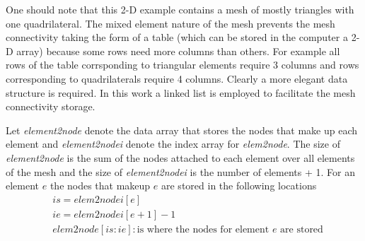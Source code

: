 One should note that this 2-D example contains a mesh of mostly triangles with one quadrilateral.  The mixed element nature of the mesh prevents the mesh connectivity taking the form of a table (which can be stored in the computer a 2-D array) because some rows need more columns than others.  For example all rows of the table corrsponding to triangular elements require 3 columns and rows corresponding to quadrilaterals require 4 columns.  Clearly a more elegant data structure is required.  In this work a linked list is employed to facilitate the mesh connectivity storage.  
  
  Let \textit{element2node} denote the data array that stores the nodes that make up each element and \textit{element2nodei} denote the index array for \textit{elem2node}.  The size of \textit{element2node} is the sum of the nodes attached to each element over all elements of the mesh and the size of \textit{element2nodei} is the number of elements + 1.  For an element $e$ the nodes that makeup $e$ are stored in the following locations 
\begin{equation}
\begin{split}
 &  is = elem2nodei[e] \\
 &  ie = elem2nodei[e+1]-1 \\
 &  elem2node[is:ie]:\text{is where the nodes for element $e$ are stored}
\end{split}
\end{equation}

